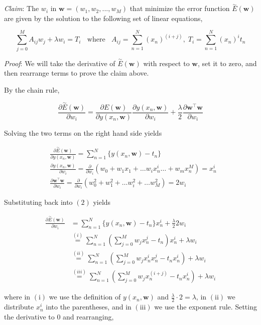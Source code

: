 \documentclass[
  0.875em,
  letterpaper,
  DIV=11,
  numbers=noendperiod]{scrartcl}
\begin{document}
\emph{Claim}: The \(w_i\) in \(\mathbf{w} = (w_1, w_2, ..., w_M)\) that
minimize the error function \(\overset{\sim}{E} (\mathbf{w})\) are given
by the solution to the following set of linear equations,

\[
\sum_{j=0}^M A_{ij}w_j + \lambda w_i = T_i \;\; \text{ where } \;\; A_{ij} = \sum_{n=1}^N(x_n)^{(i+j)}, \; T_i = \sum_{n=1}^N (x_n)^i t_n
\]

\emph{Proof}: We will take the derivative of
\(\overset{\sim}{E} (\mathbf{w})\) with respect to \(\mathbf{w}\), set
it to zero, and then rearrange terms to prove the claim above.

By the chain rule,

\[
\frac{\partial \overset{\sim}{E}(\mathbf{w})}{\partial w_i} = \frac{\partial E(\mathbf{w})}{\partial y(x_n, \mathbf{w})} \frac{\partial y(x_n, \mathbf{w})}{\partial w_i} + \frac{\lambda}{2} \frac{\partial \mathbf{w}^\intercal \mathbf{w}}{\partial w_i} \tag{2}
\]

Solving the two terms on the right hand side yields

\[
\begin{aligned}
&\frac{\partial \overset{\sim}{E}(\mathbf{w})}{\partial y(x_n, \mathbf{w})} = \sum_{n=1}^N \{y(x_n, \mathbf{w}) - t_n \} \\
&\frac{\partial y(x_n, \mathbf{w})}{\partial w_i} = \frac{\partial}{\partial w_i} (w_0 + w_1x_1 + \dots w_i x_n^i \dots + w_m x_n^M) = x_n^i \\
&\frac{\partial \mathbf{w}^\intercal \mathbf{w}}{\partial w_i} = \frac{\partial}{\partial w_i} (w_0^2 + w_1^2 + \dots w_i^2 + \dots w_M^2) = 2 w_i
\end{aligned}
\]

Substituting back into \((2)\) yields

\[
\begin{aligned}
\frac{\partial \overset{\sim}{E}(\mathbf{w})}{\partial w_i} & = \sum_{n=1}^N \{y(x_n, \mathbf{w}) - t_n \} x_n^i + \frac{\lambda}{2} 2 w_i \\
& \overset{(i)}{=} \sum_{n=1}^N (\sum_{j=0}^M w_j x_n^{j} - t_n)x_n^i + \lambda w_i  \\
& \overset{(ii)}{=} \sum_{n=1}^N (\sum_{j=0}^M w_j x_n^{i}x_n^j - t_n x_n^i) + \lambda w_i  \\
& \overset{(iii)}{=} \sum_{n=1}^N (\sum_{j=0}^M w_j x_n^{(i+j)} - t_n x_n^i) + \lambda w_i 
\end{aligned}
\]

where in \((\text{i})\) we use the definition of \(y(x_n, \mathbf{w})\)
and \(\frac{\lambda}{2} \cdot 2 = \lambda\), in \((\text{ii})\) we
distribute \(x_n^i\) into the parentheses, and in \((\text{iii})\) we
use the exponent rule. Setting the derivative to \(0\) and rearranging,
\end{document}
